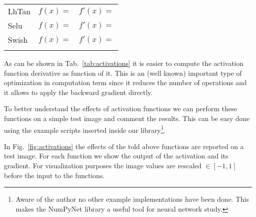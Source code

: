 \documentclass{standalone}
\begin{document}
\begin{table*}
\begin{tabular}{lcc}
LhTan    &  $f(x) = $                            &  $f'(x) = $                                                   \\

Selu     &  $f(x) = $                            &  $f'(x) = $                                                   \\

Swish    &  $f(x) = $                            &  $f'(x) = $                                                   \\

\hline\\
\end{tabular}
\caption{List of common activation functions with correspondig mathematical equation and derivative.
The derivative is expressed as function of $f(x)$ to optimize their numerical evaluation.}
\label{tab:activations}
\end{table*}

As can be shown in Tab.~\ref{tab:activations} it is easier to compute the activation function derivative as function of it.
This is an (well known) important type of optimization in computation term since it reduces the number of operations and it allows to apply the backward gradient directly.

To better understand the effects of activation functions we can perform these functions on a simple test image and comment the results.
This can be easy done using the example scripts inserted inside our library\footnote{
  Aware of the author no other example implementations have been done.
  This makes the NumPyNet library a useful tool for neural network study.
}.

In Fig.~\ref{fig:activations} the effects of the told above functions are reported on a test image.
For each function we show the output of the activation and its gradient.
For visualization purposes the image values are rescaled $\in[-1, 1]$ before the input to the functions.


\end{document}
